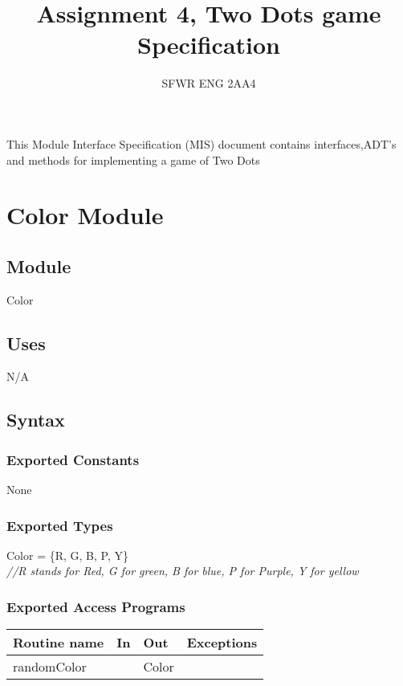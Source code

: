 \documentclass[12pt]{article}
\title{Assignment 4, Two Dots game Specification}
\author{SFWR ENG 2AA4}
\begin{document}
\maketitle
This Module Interface Specification (MIS) document contains interfaces,ADT's and
methods for implementing a game of Two Dots

\newpage

\section* {Color Module}

\subsection*{Module}

Color

\subsection* {Uses}

N/A

\subsection* {Syntax}

\subsubsection* {Exported Constants}

None

\subsubsection* {Exported Types}

Color = \{R, G, B, P, Y\}\\

\noindent \textit{//R stands for Red, G for green, B for blue, P for
  Purple, Y for yellow}

\subsubsection* {Exported Access Programs}

\begin{tabular}{| l | l | l | p{5cm} |}
\hline
\textbf{Routine name} & \textbf{In} & \textbf{Out} & \textbf{Exceptions}\\
\hline
randomColor &  & Color & ~\\
\hline
\end{tabular}
\end{document}
